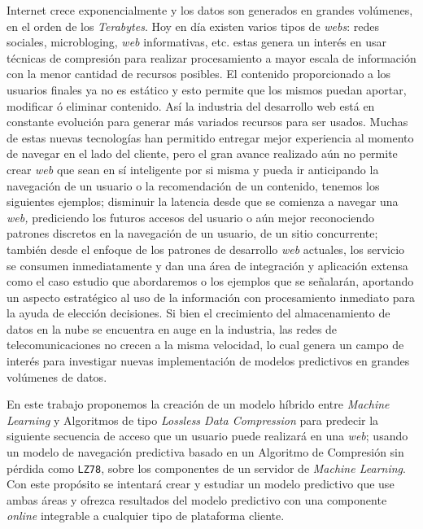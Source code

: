 
Internet crece exponencialmente  y los datos son generados en grandes volúmenes, en el orden de los \emph{Terabytes}. Hoy en día existen varios tipos de \emph{webs}: redes sociales, microbloging, \emph{web} informativas, etc. estas genera un interés en usar técnicas de compresión para realizar procesamiento a mayor escala de información con la menor cantidad de recursos posibles. El contenido proporcionado a los usuarios finales ya no es estático y esto permite que los mismos puedan  aportar, modificar ó eliminar contenido. Así  la industria del desarrollo web está en constante evolución para generar más variados recursos para ser usados. Muchas de estas nuevas tecnologías han permitido entregar mejor experiencia al momento de navegar en el lado del cliente, pero el gran avance realizado aún no permite crear \emph{web} que sean en sí inteligente por si misma y pueda ir anticipando la  navegación de un usuario o la recomendación de un contenido, tenemos los siguientes ejemplos; disminuir la latencia desde que se comienza a navegar una \emph{web,} prediciendo los futuros accesos del usuario o aún mejor reconociendo patrones discretos en la navegación de un usuario,  de un sitio concurrente; también desde el enfoque de los patrones de desarrollo \emph{web} actuales, los servicio  se consumen inmediatamente y dan una área de integración y  aplicación extensa como el caso estudio que abordaremos o los ejemplos que se señalarán, aportando un aspecto estratégico al uso de la información con procesamiento inmediato para la ayuda de elección decisiones.
Si bien el crecimiento del almacenamiento de datos en la nube se encuentra en auge en la industria, las redes de telecomunicaciones  no crecen a la misma velocidad, lo cual genera un campo de interés para investigar nuevas implementación de modelos predictivos en grandes volúmenes de datos. 

En este trabajo proponemos  la creación de un modelo híbrido entre \emph{Machine Learning} y Algoritmos de tipo \emph{Lossless Data Compression} para predecir la siguiente secuencia de acceso que un usuario puede realizará en una \emph{web}; usando un modelo de navegación predictiva basado en un Algoritmo de Compresión sin pérdida como \texttt{LZ78}, sobre los componentes de un servidor de \emph{Machine Learning}. Con este propósito se intentará crear y estudiar un modelo predictivo que use ambas áreas y  ofrezca resultados del modelo predictivo con una componente \emph{online} integrable a cualquier tipo de plataforma cliente.